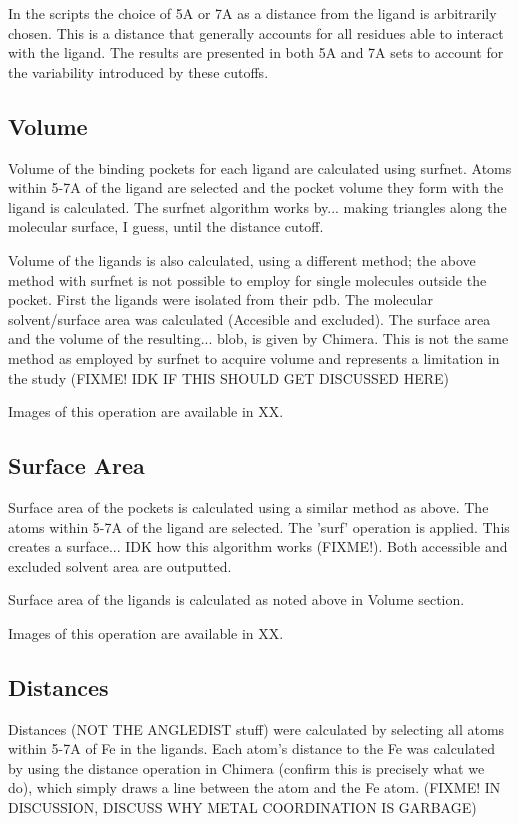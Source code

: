 	In the scripts the choice of 5A or 7A as a distance from the ligand is arbitrarily chosen. This is a distance that generally accounts for all residues able to interact with the ligand. The results are presented in both 5A and 7A sets to account for the variability introduced by these cutoffs. 
	
		\subsection*{Volume}
		
		Volume of the binding pockets for each ligand are calculated using surfnet. Atoms within 5-7A of the ligand are selected and the pocket volume they form with the ligand is calculated. The surfnet algorithm works by... making triangles along the molecular surface, I guess, until the distance cutoff.
		
		Volume of the ligands is also calculated, using a different method; the above method with surfnet is not possible to employ for single molecules outside the pocket. First the ligands were isolated from their pdb. The molecular solvent/surface area was calculated (Accesible and excluded). The surface area and the volume of the resulting... blob, is given by Chimera. This is not the same method as employed by surfnet to acquire volume and represents a limitation in the study (FIXME! IDK IF THIS SHOULD GET DISCUSSED HERE)
		
		Images of this operation are available in XX.
		
		\subsection*{Surface Area}
		Surface area of the pockets is calculated using a similar method as above. The atoms within 5-7A of the ligand are selected. The 'surf' operation is applied. This creates a surface... IDK how this algorithm works (FIXME!). Both accessible and excluded solvent area are outputted.
		
		Surface area of the ligands is calculated as noted above in Volume section.
	
		Images of this operation are available in XX. 
		
		\subsection*{Distances}
		
		Distances (NOT THE ANGLEDIST stuff) were calculated by selecting all atoms within 5-7A of Fe in the ligands. Each atom's distance to the Fe was calculated by using the distance operation in Chimera (confirm this is precisely what we do), which simply draws a line between the atom and the Fe atom. (FIXME! IN DISCUSSION, DISCUSS WHY METAL COORDINATION IS GARBAGE) 
		
